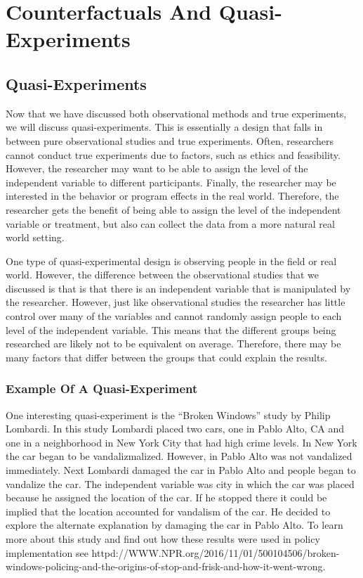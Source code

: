 \documentclass[]{book}
\theoremstyle{definition}
\theoremstyle{definition}
\theoremstyle{definition}
\theoremstyle{remark}
\begin{document}
\hypertarget{counterfactuals-and-quasi-experiments}{%
\chapter{Counterfactuals And
Quasi-Experiments}\label{counterfactuals-and-quasi-experiments}}

\hypertarget{quasi-experiments}{%
\section{Quasi-Experiments}\label{quasi-experiments}}

Now that we have discussed both observational methods and true
experiments, we will discuss quasi-experiments. This is essentially a
design that falls in between pure observational studies and true
experiments. Often, researchers cannot conduct true experiments due to
factors, such as ethics and feasibility. However, the researcher may
want to be able to assign the level of the independent variable to
different participants. Finally, the researcher may be interested in the
behavior or program effects in the real world. Therefore, the researcher
gets the benefit of being able to assign the level of the independent
variable or treatment, but also can collect the data from a more natural
real world setting.

One type of quasi-experimental design is observing people in the field
or real world. However, the difference between the observational studies
that we discussed is that is that there is an independent variable that
is manipulated by the researcher. However, just like observational
studies the researcher has little control over many of the variables and
cannot randomly assign people to each level of the independent variable.
This means that the different groups being researched are likely not to
be equivalent on average. Therefore, there may be many factors that
differ between the groups that could explain the results.

\hypertarget{example-of-a-quasi-experiment}{%
\subsection{Example Of A
Quasi-Experiment}\label{example-of-a-quasi-experiment}}

One interesting quasi-experiment is the ``Broken Windows'' study by
Philip Lombardi. In this study Lombardi placed two cars, one in Pablo
Alto, CA and one in a neighborhood in New York City that had high crime
levels. In New York the car began to be vandalizmalized. However, in
Pablo Alto was not vandalized immediately. Next Lombardi damaged the car
in Pablo Alto and people began to vandalize the car. The independent
variable was city in which the car was placed because he assigned the
location of the car. If he stopped there it could be implied that the
location accounted for vandalism of the car. He decided to explore the
alternate explanation by damaging the car in Pablo Alto. To learn more
about this study and find out how these results were used in policy
implementation see
httpd://WWW.NPR.org/2016/11/01/500104506/broken-windows-policing-and-the-origins-of-stop-and-frisk-and-how-it-went-wrong.
\end{document}
